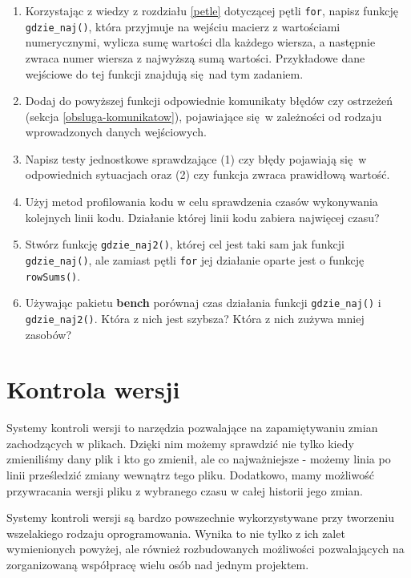 \documentclass[paper=6in:9in,pagesize=pdftex,headinclude=on,footinclude=on,10pt]{scrbook}
\begin{document}
\begin{enumerate}
\def\labelenumi{\arabic{enumi})}
\item
  Korzystając z wiedzy z rozdziału \ref{petle} dotyczącej pętli \texttt{for}, napisz funkcję \texttt{gdzie\_naj()}, która przyjmuje na wejściu macierz z wartościami numerycznymi, wylicza sumę wartości dla każdego wiersza, a następnie zwraca numer wiersza z najwyższą sumą wartości.
  Przykładowe dane wejściowe do tej funkcji znajdują się~nad tym zadaniem.
\item
  Dodaj do powyższej funkcji odpowiednie komunikaty błędów czy ostrzeżeń (sekcja \ref{obsluga-komunikatow}), pojawiające się~w zależności od rodzaju wprowadzonych danych wejściowych.
\item
  Napisz testy jednostkowe sprawdzające (1) czy błędy pojawiają się~w odpowiednich sytuacjach oraz (2) czy funkcja zwraca prawidłową wartość.
\item
  Użyj metod profilowania kodu w celu sprawdzenia czasów wykonywania kolejnych linii kodu.
  Działanie której linii kodu zabiera najwięcej czasu?
\item
  Stwórz funkcję \texttt{gdzie\_naj2()}, której cel jest taki sam jak funkcji \texttt{gdzie\_naj()}, ale zamiast pętli \texttt{for} jej działanie oparte jest o funkcję \texttt{rowSums()}.
\item
  Używając pakietu \textbf{bench} porównaj czas działania funkcji \texttt{gdzie\_naj()} i \texttt{gdzie\_naj2()}.
  Która z nich jest szybsza?
  Która z nich zużywa mniej zasobów?
\end{enumerate}

\hypertarget{kontrola-wersji}{%
\chapter{Kontrola wersji}\label{kontrola-wersji}}

Systemy kontroli wersji to narzędzia pozwalające na zapamiętywaniu zmian zachodzących w plikach.
Dzięki nim możemy sprawdzić nie tylko kiedy zmieniliśmy dany plik i kto go zmienił, ale co najważniejsze - możemy linia po linii prześledzić zmiany wewnątrz tego pliku.
Dodatkowo, mamy możliwość przywracania wersji pliku z wybranego czasu w całej historii jego zmian.

Systemy kontroli wersji są bardzo powszechnie wykorzystywane przy tworzeniu wszelakiego rodzaju oprogramowania.
Wynika to nie tylko z ich zalet wymienionych powyżej, ale również rozbudowanych możliwości pozwalających na zorganizowaną współpracę wielu osób nad jednym projektem.
\end{document}
